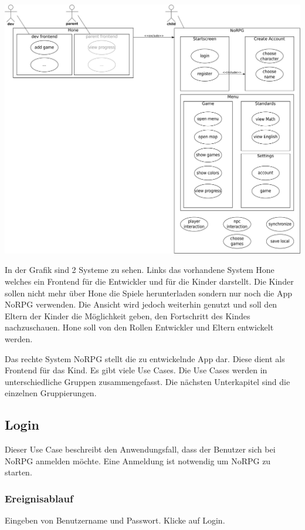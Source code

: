 	\begin{center}
		\includegraphics[width=\textwidth]{pics/OUCD.pdf}
	\end{center}
	
	In der Grafik sind 2 Systeme zu sehen. Links das vorhandene System Hone welches ein Frontend für die Entwickler und für die Kinder darstellt. Die Kinder sollen nicht mehr über Hone die Spiele herunterladen sondern nur noch die App NoRPG verwenden. Die Ansicht wird jedoch weiterhin genutzt und soll den Eltern der Kinder die Möglichkeit geben, den Fortschritt des Kindes nachzuschauen. Hone soll von den Rollen Entwickler und Eltern entwickelt werden.
	
	Das rechte System NoRPG stellt die zu entwickelnde App dar. Diese dient als Frontend für das Kind. Es gibt viele Use Cases. Die Use Cases werden in unterschiedliche Gruppen zusammengefasst. Die nächsten Unterkapitel sind die einzelnen Gruppierungen.
	
	\subsection{Login}
		Dieser Use Case beschreibt den Anwendungsfall, dass der Benutzer sich bei NoRPG anmelden möchte. Eine Anmeldung ist notwendig um NoRPG zu starten. 
			
		\subsubsection{Ereignisablauf}
			Eingeben von Benutzername und Passwort.	Klicke auf Login.
			
